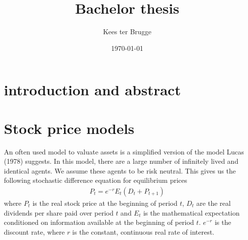 \documentclass{article}
\title{Bachelor thesis}
\author{Kees ter Brugge\\}
\date{\today}
\makeatletter
\def\maketitle{%
  \null
  \thispagestyle{empty}%
  \vfill
  \begin{center}\leavevmode
    \normalfont
    {\LARGE \@title\par}%
    \vskip 1cm
    {\Large \@author\par}%
    \vskip 1cm
    {\Large \@date\par}%
  \end{center}%
  \vfill
  \null
  \cleardoublepage
  }
\makeatother
\begin{document}
 \maketitle



\newpage
\section{introduction and abstract}

\newpage

\section{Stock price models}

An often used model to valuate assets is a simplified version of the model Lucas (1978) suggests. In this model, there are a large number of infinitely lived and identical agents. We assume these agents to be risk neutral. This gives us the following stochastic difference equation for equilibrium prices
\begin{eqnarray}
P_t = e^{-r} E_t(D_t + P_{t+1}) \label{standard}
\end{eqnarray}
where $P_t$ is the real stock price at the beginning of period $t$, $D_t $ are the real dividends per share paid over period $t$ and $E_t$ is the mathematical expectation conditioned on information available at the beginning of period $t$. $e^{-r}$ is the discount rate, where $r $ is the constant, continuous real rate of interest. 
\end{document}
